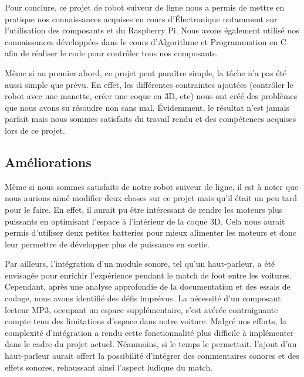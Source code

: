 Pour conclure, ce projet de robot suiveur de ligne nous a permis de mettre en pratique nos connaissances acquises en cours d'Électronique notamment sur l'utilisation des composants et du Raspberry Pi. Nous avons également utilisé nos connaissances développées dans le cours d'Algorithme et Programmation en C afin de réaliser le code pour contrôler tous nos composants.

Même si au premier abord, ce projet peut paraître simple, la tâche n'a pas été aussi simple que prévu. En effet, les différentes contraintes ajoutées (contrôler le robot avec une manette, créer une coque en 3D, etc) nous ont créé des problèmes que nous avons su résoudre non sans mal. Évidemment, le résultat n'est jamais parfait mais nous sommes satisfaits du travail rendu et des compétences acquises lors de ce projet.

\subsection{Améliorations}
Même si nous sommes satisfaits de notre robot suiveur de ligne, il est à noter que nous aurions aimé modifier deux choses sur ce projet mais qu'il était un peu tard pour le faire. En effet, il aurait pu être intéressant de rendre les moteurs plus puissants en optimisant l'espace à l'intérieur de la coque 3D. Cela nous aurait permis d'utiliser deux petites batteries pour mieux alimenter les moteurs et donc leur permettre de développer plus de puissance en sortie.

Par ailleurs, l'intégration d'un module sonore, tel qu'un haut-parleur, a été envisagée pour enrichir l'expérience pendant le match de foot entre les voitures. Cependant, après une analyse approfondie de la documentation et des essais de codage, nous avons identifié des défis imprévus. La nécessité d'un composant lecteur MP3, occupant un espace supplémentaire, s'est avérée contraignante compte tenu des limitations d'espace dans notre voiture. Malgré nos efforts, la complexité d'intégration a rendu cette fonctionnalité plus difficile à implémenter dans le cadre du projet actuel. Néanmoins, si le temps le permettait, l'ajout d'un haut-parleur aurait offert la possibilité d'intégrer des commentaires sonores et des effets sonores, rehaussant ainsi l'aspect ludique du match.
\newpage